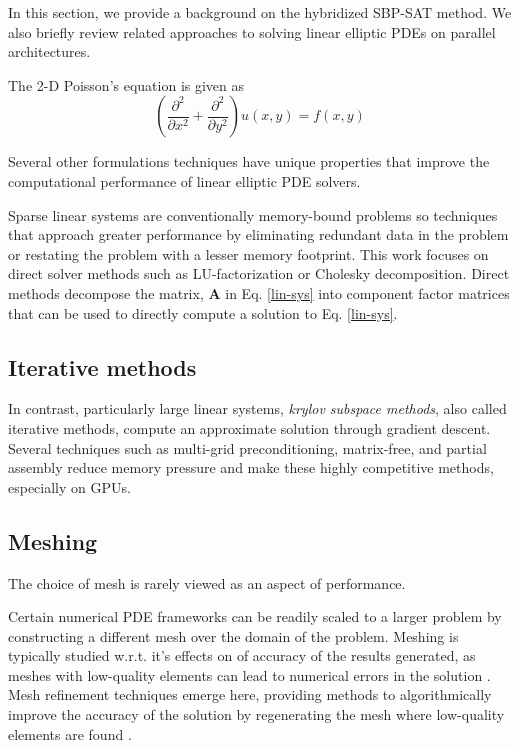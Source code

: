 %
%
%
In this section, we provide a background on the hybridized SBP-SAT method.
We also briefly review related approaches to solving linear elliptic PDEs on parallel architectures. 

%
%
%
The 2-D Poisson's equation is given as 
\begin{equation}
    \left( \dfrac{\partial^2}{\partial x^2} + \dfrac{\partial^2}{\partial y^2} \right) u(x, y) = f(x, y) 
\end{equation}

%
%
%
Several other formulations techniques have unique properties that improve the computational performance of linear elliptic PDE solvers. 




Sparse linear systems are conventionally memory-bound problems so techniques that approach greater performance by eliminating redundant data in the problem or restating the problem with a lesser memory footprint. 
This work focuses on direct solver methods such as LU-factorization or Cholesky decomposition.
Direct methods decompose the matrix, $\mathbf{A}$ in Eq. \eqref{lin-sys} into component factor matrices that can be used to directly compute a solution to Eq. \eqref{lin-sys}.

\subsection{Iterative methods}
In contrast, particularly large linear systems, \emph{krylov subspace methods}, also called iterative methods, compute an approximate solution through gradient descent. 
Several techniques such as multi-grid preconditioning, matrix-free, and partial assembly reduce memory pressure and make these highly competitive methods, especially on GPUs.

\subsection*{Meshing}
The choice of mesh is rarely viewed as an aspect of performance. 

Certain numerical PDE frameworks can be readily scaled to a larger problem by constructing a different mesh over the domain of the problem. Meshing is typically studied w.r.t. it's effects on of accuracy of the results generated, as meshes with low-quality elements can lead to numerical errors in the solution \citep{sharma2021overset, dervieux2003theoretical}. Mesh refinement techniques emerge here, providing methods to algorithmically improve the accuracy of the solution by regenerating the mesh where low-quality elements are found \citep{berger1984adaptive, verfurth1994posteriori, geiersbach2020stochastic, bespalov2022error}. 


